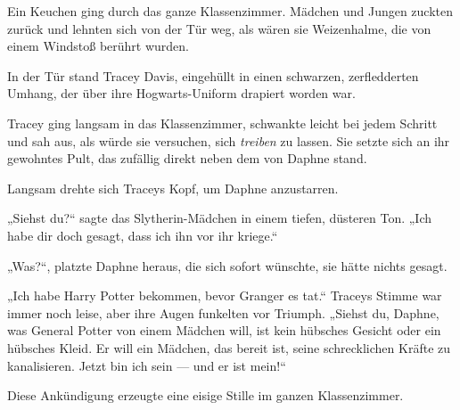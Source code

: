 Ein Keuchen ging durch das ganze Klassenzimmer. Mädchen und Jungen zuckten zurück und lehnten sich von der Tür weg, als wären sie Weizenhalme, die von einem Windstoß berührt wurden.

In der Tür stand Tracey Davis, eingehüllt in einen schwarzen, zerfledderten Umhang, der über ihre Hogwarts-Uniform drapiert worden war.

Tracey ging langsam in das Klassenzimmer, schwankte leicht bei jedem Schritt und sah aus, als würde sie versuchen, sich \emph{treiben} zu lassen. Sie setzte sich an ihr gewohntes Pult, das zufällig direkt neben dem von Daphne stand.

Langsam drehte sich Traceys Kopf, um Daphne anzustarren.

„Siehst du?“ sagte das Slytherin-Mädchen in einem tiefen, düsteren Ton.
„Ich habe dir doch gesagt, dass ich ihn vor ihr kriege.“

„Was?“, platzte Daphne heraus, die sich sofort wünschte, sie hätte nichts gesagt.

„Ich habe Harry Potter bekommen, bevor Granger es tat.“ Traceys Stimme war immer noch leise, aber ihre Augen funkelten vor Triumph.
„Siehst du, Daphne, was General Potter von einem Mädchen will, ist kein hübsches Gesicht oder ein hübsches Kleid. Er will ein Mädchen, das bereit ist, seine schrecklichen Kräfte zu kanalisieren. Jetzt bin ich sein — und er ist mein!“

Diese Ankündigung erzeugte eine eisige Stille im ganzen Klassenzimmer.

